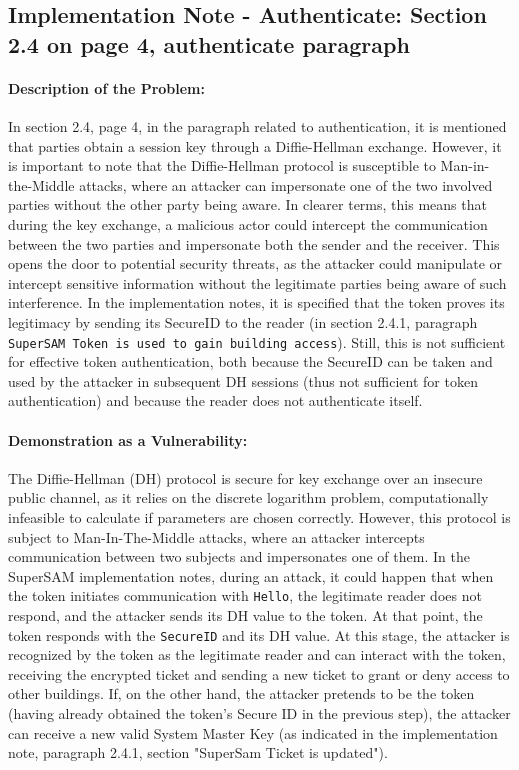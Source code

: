 \documentclass[12pt]{article}
\begin{document}
\subsection{Implementation Note - Authenticate: Section 2.4 on page 4, authenticate paragraph} \label{Authenticate}

    \paragraph{Description of the Problem:}
    In section 2.4, page 4, in the paragraph related to authentication, it is mentioned that parties obtain a session key through a Diffie-Hellman exchange. However, it is important to note that the Diffie-Hellman protocol is susceptible to Man-in-the-Middle attacks, where an attacker can impersonate one of the two involved parties without the other party being aware. 
    In clearer terms, this means that during the key exchange, a malicious actor could intercept the communication between the two parties and impersonate both the sender and the receiver. This opens the door to potential security threats, as the attacker could manipulate or intercept sensitive information without the legitimate parties being aware of such interference.
    In the implementation notes, it is specified that the token proves its legitimacy by sending its SecureID to the reader (in section 2.4.1, paragraph \texttt{SuperSAM Token is used to gain building access}). Still, this is not sufficient for effective token authentication, both because the SecureID can be taken and used by the attacker in subsequent DH sessions (thus not sufficient for token authentication) and because the reader does not authenticate itself.

    \paragraph{Demonstration as a Vulnerability:}
    The Diffie-Hellman (DH) protocol is secure for key exchange over an insecure public channel, as it relies on the discrete logarithm problem, computationally infeasible to calculate if parameters are chosen correctly. However, this protocol is subject to Man-In-The-Middle attacks, where an attacker intercepts communication between two subjects and impersonates one of them.
    In the SuperSAM implementation notes, during an attack, it could happen that when the token initiates communication with \texttt{Hello}, the legitimate reader does not respond, and the attacker sends its DH value to the token. At that point, the token responds with the \texttt{SecureID} and its DH value. At this stage, the attacker is recognized by the token as the legitimate reader and can interact with the token, receiving the encrypted ticket and sending a new ticket to grant or deny access to other buildings.
    If, on the other hand, the attacker pretends to be the token (having already obtained the token's Secure ID in the previous step), the attacker can receive a new valid System Master Key (as indicated in the implementation note, paragraph 2.4.1, section "SuperSam Ticket is updated").
\end{document}
